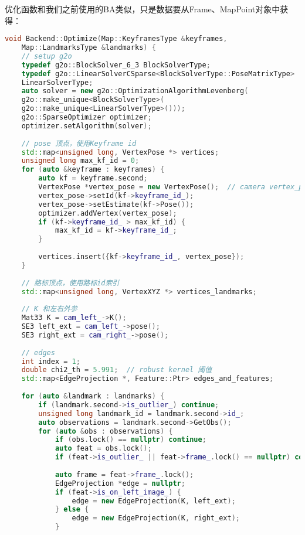 优化函数和我们之前使用的BA类似，只是数据要从Frame、MapPoint对象中获得：
\begin{lstlisting}[language=c++,caption=slambook2/ch13/src/backend.cpp]
void Backend::Optimize(Map::KeyframesType &keyframes,
    Map::LandmarksType &landmarks) {
    // setup g2o
    typedef g2o::BlockSolver_6_3 BlockSolverType;
    typedef g2o::LinearSolverCSparse<BlockSolverType::PoseMatrixType>
    LinearSolverType;
    auto solver = new g2o::OptimizationAlgorithmLevenberg(
    g2o::make_unique<BlockSolverType>(
    g2o::make_unique<LinearSolverType>()));
    g2o::SparseOptimizer optimizer;
    optimizer.setAlgorithm(solver);
    
    // pose 顶点，使用Keyframe id
    std::map<unsigned long, VertexPose *> vertices;
    unsigned long max_kf_id = 0;
    for (auto &keyframe : keyframes) {
        auto kf = keyframe.second;
        VertexPose *vertex_pose = new VertexPose();  // camera vertex_pose
        vertex_pose->setId(kf->keyframe_id_);
        vertex_pose->setEstimate(kf->Pose());
        optimizer.addVertex(vertex_pose);
        if (kf->keyframe_id_ > max_kf_id) {
            max_kf_id = kf->keyframe_id_;
        }
        
        vertices.insert({kf->keyframe_id_, vertex_pose});
    }
    
    // 路标顶点，使用路标id索引
    std::map<unsigned long, VertexXYZ *> vertices_landmarks;
    
    // K 和左右外参
    Mat33 K = cam_left_->K();
    SE3 left_ext = cam_left_->pose();
    SE3 right_ext = cam_right_->pose();
    
    // edges
    int index = 1;
    double chi2_th = 5.991;  // robust kernel 阈值
    std::map<EdgeProjection *, Feature::Ptr> edges_and_features;
    
    for (auto &landmark : landmarks) {
        if (landmark.second->is_outlier_) continue;
        unsigned long landmark_id = landmark.second->id_;
        auto observations = landmark.second->GetObs();
        for (auto &obs : observations) {
            if (obs.lock() == nullptr) continue;
            auto feat = obs.lock();
            if (feat->is_outlier_ || feat->frame_.lock() == nullptr) continue;
            
            auto frame = feat->frame_.lock();
            EdgeProjection *edge = nullptr;
            if (feat->is_on_left_image_) {
                edge = new EdgeProjection(K, left_ext);
            } else {
                edge = new EdgeProjection(K, right_ext);
            }
            

\end{lstlisting}
